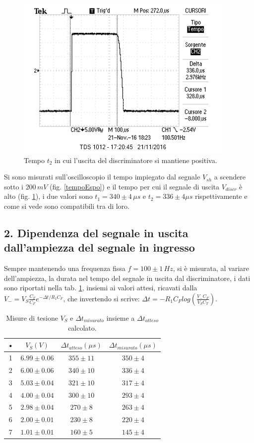 \documentclass[10pt,a4paper]{article}
\begin{document}
\begin{figure}[htb!]
\centering
\includegraphics[scale=1.0]{immagini/tempoQuadra.png}
\caption{Tempo $t_2$ in cui l'uscita del discriminatore si mantiene positiva.}
\label{tempoUscita}
\end{figure}

Si sono misurati sull'oscilloscopio il tempo impiegato dal segnale $V_{sh}$ a scendere sotto i  $200 \, mV$ (fig. \ref{tempoEspo}) e il tempo per cui il segnale di uscita $V_{discr}$ è alto (fig. \ref{tempoUscita}), i due valori sono $t_1 = 340 \pm 4 \, \mu s$ e  $t_2 = 336 \pm 4 \mu s$ rispettivamente e come si vede sono compatibili tra di loro.

\subsection*{2. Dipendenza del segnale in uscita dall'ampiezza del segnale in ingresso}

Sempre mantenendo una frequenza fissa $f = 100 \pm 1 \, Hz$, si è misurata, al variare dell'ampiezza, la durata nel tempo del segnale in uscita dal discriminatore, i dati sono riportati nella tab. \ref{dati}, insiemi ai valori attesi, ricavati dalla $V_-=V_S \frac{C_T}{C_F} e^{- \Delta t/R_1 C_F}$, che invertendo si scrive: $\Delta t = -R_1 C_F log\left( \frac{V_- C_F}{V_S C_T}\right)$.

\begin{table}[!ht]
\centering
\begin{tabular}{|c|c|c|c|}
\hline 
• & $V_{S} (V)$ & $\Delta t _ {atteso} (\mu s)$ & $\Delta t _ {misurato} (\mu s)$ \\ 
\hline
1 & $6.99 \pm 0.06$ & $355 \pm 11$ & $350 \pm 4$ \\
2 & $6.00 \pm 0.06$ & $340 \pm 10$ & $336 \pm 4$ \\  
3 & $5.03 \pm 0.04$ & $321 \pm 10$ & $317 \pm 4$ \\  
4 & $4.00 \pm 0.04$ & $300 \pm 10$ & $293 \pm 4$ \\ 
5 & $2.98 \pm 0.04$ & $270 \pm 8$ & $263 \pm 4$ \\ 
6 & $2.00 \pm 0.01$ & $230 \pm 8$ & $220 \pm 4$ \\ 
7 & $1.01 \pm 0.01$ & $160 \pm 5$ & $145 \pm 4$ \\   
\hline
\end{tabular} 
\caption{Misure di tesione $V_S$ e $\Delta t _ {misurato}$ insieme a $\Delta t _ {atteso}$ calcolato.}
\label{dati}
\end{table}
\end{document}
